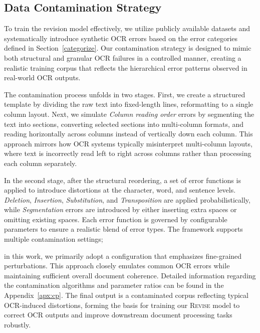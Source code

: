 \subsection{Data Contamination Strategy}
\label{strategy}
To train the revision model effectively, we utilize publicly available datasets and systematically introduce synthetic OCR errors based on the error categories defined in Section~\ref{categorize}. Our contamination strategy is designed to mimic both structural and granular OCR failures in a controlled manner, creating a realistic training corpus that reflects the hierarchical error patterns observed in real-world OCR outputs.

The contamination process unfolds in two stages. First, we create a structured template by dividing the raw text into fixed-length lines, reformatting to a single column layout. Next, we simulate \textit{Column reading order} errors by segmenting the text into sections, converting selected sections into multi-column formats, and reading horizontally across columns instead of vertically down each column. This approach mirrors how OCR systems typically misinterpret multi-column layouts, where text is incorrectly read left to right across columns rather than processing each column separately.


In the second stage, after the structural reordering, a set of error functions is applied to introduce distortions at the character, word, and sentence levels. \textit{Deletion}, \textit{Insertion}, \textit{Substitution}, and \textit{Transposition} are applied probabilistically, while \textit{Segmentation} errors are introduced by either inserting extra spaces or omitting existing spaces. Each error function is governed by configurable parameters to ensure a realistic blend of error types. The framework supports multiple contamination settings;
 
in this work, we primarily adopt a configuration that emphasizes fine-grained perturbations. This approach closely emulates common OCR errors while maintaining sufficient overall document coherence. {Detailed information regarding the contamination algorithms and parameter ratios can be found in the Appendix~\ref{apx:cp}.} 
The final output is a contaminated corpus reflecting typical OCR-induced distortions, forming the basis for training our \textsc{Revise} model to correct OCR outputs and improve downstream document processing tasks robustly.







